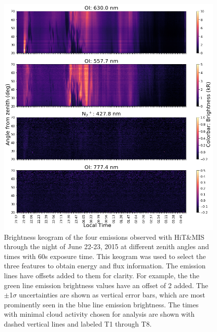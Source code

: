 \documentclass[crop=false,class=mitthesis,oneside,font=12pt]{standalone}
\begin{document}
\begin{figure}[H]
	\centering\includegraphics[width=35pc]{brg_night.png}
	\caption{Brightness keogram of the four emissions observed with HiT\&MIS through the night of June 22-23, 2015 at different zenith angles and times with 60s exposure time. This keogram was used to select the three features to obtain energy and flux information.
		The emission lines have offsets added to them for clarity. For example, the the green line emission brightness values have an offset of 2 added. The $\pm$1$\sigma$ uncertainties are shown as vertical error bars, which are most prominently seen in the blue line emission brightness.
		The times with minimal cloud activity chosen for analysis are shown with dashed vertical lines and labeled T1 through T8.}
	\label{feature:brg}
\end{figure}
\end{document}
